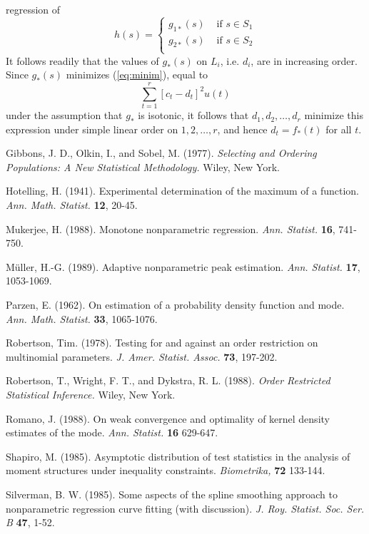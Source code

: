 regression of \begin{displaymath} h(s) = \left \{
	\begin{array}{cl}
		g_{1*}(s) & \mbox{ if $s \in S_1$}\\
		g_{2*}(s) & \mbox{ if $s \in S_2$}\\
	\end{array} \right .  \end{displaymath} It follows
readily that the values of $g_*(s)$ on $L_i$, i.e. $d_i$,
are in increasing order.  Since $g_*(s)$ minimizes
(\ref{eq:minim}), equal to \begin{displaymath} \sum_{t=1}^{r}
[ c_t - d_t ]^2u(t) \end{displaymath} under the assumption
that $g_*$ is isotonic, it follows that $d_1, d_2, \ldots,
d_r$ minimize this expression under simple linear order on
$1, 2, \ldots, r$, and hence $d_t = f_*(t)$ for all $t$.
\qued

\begin{thebibliography}{99}

 Gibbons, J. D., Olkin, I., and Sobel, M.
(1977).  {\em Selecting and Ordering Populations:  A New
Statistical Methodology.}  Wiley, New York.

 Hotelling, H. (1941).  Experimental
determination of the maximum of a function.  {\em Ann. Math.
Statist.} {\bf 12}, 20-45.

 Mukerjee, H.  (1988).  Monotone nonparametric
regression.  {\em Ann.  Statist.} {\bf 16}, 741-750.

 M\"{u}ller, H.-G. (1989).  Adaptive
nonparametric peak estimation.  {\em Ann.  Statist.} {\bf 17},
1053-1069.

 Parzen, E. (1962).  On estimation of a
probability density function and mode.  {\em Ann. Math. Statist.}
{\bf 33}, 1065-1076.

 Robertson, Tim.  (1978).  Testing for and
against an order restriction on multinomial parameters.  {\em J.
Amer. Statist. Assoc.} {\bf 73}, 197-202.

 Robertson, T.,
Wright, F. T., and Dykstra, R.  L. (1988).  {\em Order Restricted
Statistical Inference.}  Wiley, New York.

 Romano, J.  (1988).  On weak convergence and
optimality of kernel density estimates of the mode.  {\em Ann.
Statist.} {\bf 16} 629-647.

 Shapiro, M.  (1985). Asymptotic distribution of
test statistics in the analysis of moment structures under
inequality constraints. {\em Biometrika,} {\bf 72} 133-144.

 Silverman, B. W. (1985).  Some aspects of the
spline smoothing approach to nonparametric regression curve
fitting (with discussion).  {\em J. Roy. Statist. Soc. Ser. B}
{\bf 47}, 1-52.  \end{thebibliography}


